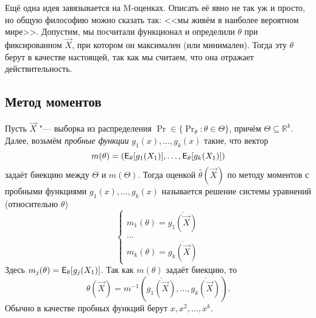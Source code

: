 Ещё одна идея завязывается на M-оценках.
Описать её явно не так уж и просто, но общую философию можно сказать так: <<мы живём в наиболее вероятном мире>>.
Допустим, мы посчитали функционал и определили $\theta$ при фиксированном $\vec{X}$, при котором он максимален (или минимален).
Тогда эту $\theta$ берут в качестве настоящей, так как мы считаем, что она отражает действительность.

\subsection{Метод моментов}
Пусть $\vec{X}$ "--- выборка из распределения $\Pr \in \{\Pr_{\theta} \colon \theta \in \Theta\}$, причём $\Theta \subseteq \mathbb{R}^{k}$.
Далее, возьмём \emph{пробные функции} $g_{1}(x), \ldots, g_{k}(x)$ такие, что вектор
\[
	m(\theta) = (\operatorname{\mathsf{E}}_{\theta}[g_{1}(X_{1})], \ldots, \operatorname{\mathsf{E}}_{\theta}[g_{k}(X_{1})])
\]
задаёт биекцию между $\Theta$ и $m(\Theta)$.
Тогда оценкой $\hat{\theta}(\vec{X})$ по методу моментов с пробными функциями $g_{1}(x), \ldots, g_{k}(x)$ называется решение системы уравнений (относительно $\theta$)
\[
	\begin{cases}
		m_{1}(\theta) = \overline{g_{1}(\vec{X})} \\
		\ldots \\
		m_{k}(\theta) = \overline{g_{k}(\vec{X})}
	\end{cases}
\]
Здесь $m_{j}(\theta) = \operatorname{\mathsf{E}}_{\theta}[g_{j}(X_{1})]$. Так как $m(\theta)$ задаёт биекцию, то
\[
	\hat{\theta}(\vec{X}) = m^{-1}(\overline{g_{1}(\vec{X})}, \ldots, \overline{g_{k}(\vec{X})}).
\]
Обычно в качестве пробных функций берут $x, x^{2}, \ldots, x^{k}$.

